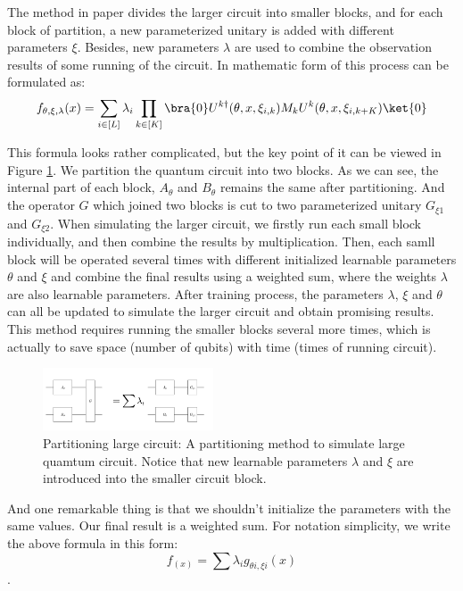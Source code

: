 \documentclass[sigconf]{acmart}
\begin{document}
The method in paper \cite{marshall2022high} divides the larger circuit into smaller blocks, and for each block of partition, a new parameterized unitary is added with different parameters $\xi$. Besides, new parameters $\lambda$ are used to combine the observation results of some running of the circuit. In mathematic form of this process can be formulated as:
$$f_{\theta,\xi,\lambda}(x)=\sum_{i\in [L]}\lambda_i\prod_{k\in [K]}\bra{0}U^{k\dagger}(\theta,x,\xi_{i,k})M_kU^k(\theta,x,\xi_{i,k+K})\ket{0}$$

This formula looks rather complicated, but the key point of it can be viewed in Figure \ref{fig:part}. We partition the quantum circuit into two blocks. As we can see, the internal part of each block, $A_{\theta}$ and $B_{\theta}$ remains the same after partitioning. And the operator $G$ which joined two blocks is cut to two parameterized unitary $G_{\xi 1}$ and $G_{\xi 2}$. When simulating the larger circuit, we firstly run each small block individually, and then combine the results by multiplication. Then, each samll block will be operated several times with different initialized learnable parameters $\theta$ and $\xi$ and combine the final results using a weighted sum, where the weights $\lambda$ are also learnable parameters. After training process, the parameters $\lambda$, $\xi$ and $\theta$ can all be updated to simulate the larger circuit and obtain promising results. This method requires running the smaller blocks several more times, which is actually to save space (number of qubits) with time (times of running circuit).

\begin{figure}[!ht]
	\centering
	\includegraphics[width=0.45\textwidth]{part.png}
	\caption{Partitioning large circuit: {\small \textnormal{A partitioning method to simulate large quamtum circuit. Notice that new learnable parameters $\lambda$ and $\xi$ are introduced into the smaller circuit block.}} }
	\label{fig:part}
\end{figure}

And one remarkable thing is that we shouldn't initialize the parameters with the same values. Our final result is a weighted sum. For notation simplicity, we write the above formula in this form:
$$f_(x)=\sum \lambda_i g_{\theta i, \xi i}(x)$$.
\end{document}
